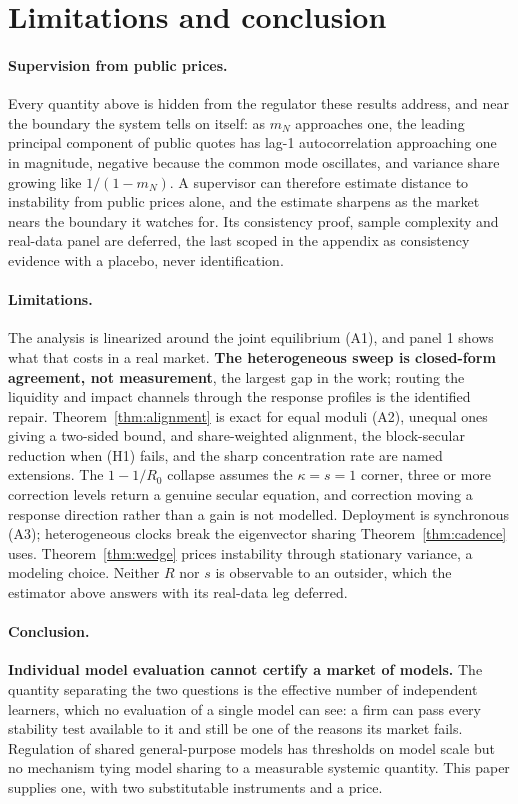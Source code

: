 \documentclass{article}
\theoremstyle{plain}
\theoremstyle{definition}
\newcommand{\mN}{m_N}
\begin{document}
\section{Limitations and conclusion}
\label{sec:limitations}

\paragraph{Supervision from public prices.}
Every quantity above is hidden from the regulator these results address, and near the boundary the system tells on itself: as $\mN$ approaches one, the leading principal component of public quotes has lag-1 autocorrelation approaching one in magnitude, negative because the common mode oscillates, and variance share growing like $1/(1-\mN)$. A supervisor can therefore estimate distance to instability from public prices alone, and the estimate sharpens as the market nears the boundary it watches for. Its consistency proof, sample complexity and real-data panel are deferred, the last scoped in the appendix as consistency evidence with a placebo, never identification.

\paragraph{Limitations.}
The analysis is linearized around the joint equilibrium (A1), and panel 1 shows what that costs in a real market. \textbf{The heterogeneous sweep is closed-form agreement, not measurement}, the largest gap in the work; routing the liquidity and impact channels through the response profiles is the identified repair. Theorem~\ref{thm:alignment} is exact for equal moduli (A2), unequal ones giving a two-sided bound, and share-weighted alignment, the block-secular reduction when (H1) fails, and the sharp concentration rate are named extensions. The $1-1/R_0$ collapse assumes the $\kappa=s=1$ corner, three or more correction levels return a genuine secular equation, and correction moving a response direction rather than a gain is not modelled. Deployment is synchronous (A3); heterogeneous clocks break the eigenvector sharing Theorem~\ref{thm:cadence} uses. Theorem~\ref{thm:wedge} prices instability through stationary variance, a modeling choice. Neither $R$ nor $s$ is observable to an outsider, which the estimator above answers with its real-data leg deferred.

\paragraph{Conclusion.}
\textbf{Individual model evaluation cannot certify a market of models.} The quantity separating the two questions is the effective number of independent learners, which no evaluation of a single model can see: a firm can pass every stability test available to it and still be one of the reasons its market fails. Regulation of shared general-purpose models has thresholds on model scale but no mechanism tying model sharing to a measurable systemic quantity. This paper supplies one, with two substitutable instruments and a price.
\end{document}
